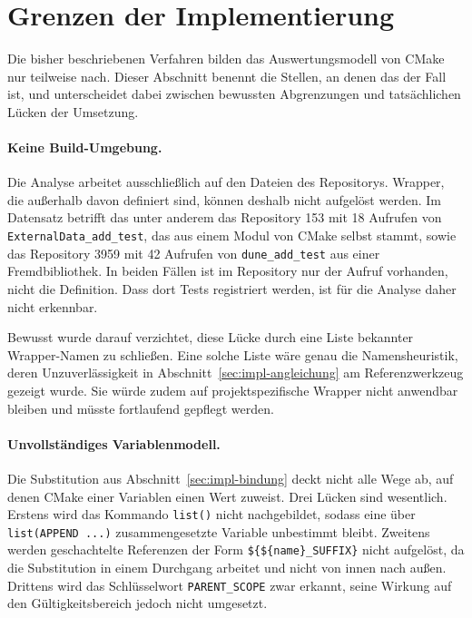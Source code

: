 \documentclass[12pt,a4paper,twoside,headsepline,parskip=half]{scrreprt}
\begin{document}
\label{sec:impl-qualitaet}
\section{Grenzen der Implementierung}
\label{sec:impl-grenzen}

Die bisher beschriebenen Verfahren bilden das Auswertungsmodell von CMake nur
teilweise nach. Dieser Abschnitt benennt die Stellen, an denen das der Fall ist, und
unterscheidet dabei zwischen bewussten Abgrenzungen und tatsächlichen Lücken der
Umsetzung.

\paragraph{Keine Build-Umgebung.}
Die Analyse arbeitet ausschließlich auf den Dateien des Repositorys. Wrapper, die
außerhalb davon definiert sind, können deshalb nicht aufgelöst werden. Im Datensatz
betrifft das unter anderem das Repository 153 mit 18 Aufrufen von
\texttt{ExternalData\_add\_test}, das aus einem Modul von CMake selbst stammt, sowie
das Repository 3959 mit 42 Aufrufen von \texttt{dune\_add\_test} aus einer
Fremdbibliothek. In beiden Fällen ist im Repository nur der Aufruf vorhanden, nicht
die Definition. Dass dort Tests registriert werden, ist für die Analyse daher nicht
erkennbar.

Bewusst wurde darauf verzichtet, diese Lücke durch eine Liste bekannter
Wrapper-Namen zu schließen. Eine solche Liste wäre genau die Namensheuristik, deren
Unzuverlässigkeit in Abschnitt~\ref{sec:impl-angleichung} am Referenzwerkzeug gezeigt
wurde. Sie würde zudem auf projektspezifische Wrapper nicht anwendbar bleiben und
müsste fortlaufend gepflegt werden.

\paragraph{Unvollständiges Variablenmodell.}
Die Substitution aus Abschnitt~\ref{sec:impl-bindung} deckt nicht alle Wege ab, auf
denen CMake einer Variablen einen Wert zuweist. Drei Lücken sind wesentlich. Erstens
wird das Kommando \texttt{list()} nicht nachgebildet, sodass eine über
\texttt{list(APPEND ...)} zusammengesetzte Variable unbestimmt bleibt. Zweitens werden
geschachtelte Referenzen der Form \texttt{\$\{\$\{name\}\_SUFFIX\}} nicht aufgelöst,
da die Substitution in einem Durchgang arbeitet und nicht von innen nach außen.
Drittens wird das Schlüsselwort \texttt{PARENT\_SCOPE} zwar erkannt, seine Wirkung auf
den Gültigkeitsbereich jedoch nicht umgesetzt.
\end{document}
